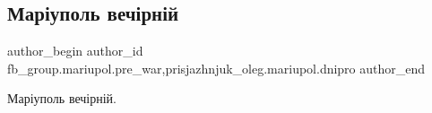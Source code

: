  
 
 
 
 

\subsection{Маріуполь вечірній}
\label{sec:09_01_2023.fb.fb_group.mariupol.pre_war.3.mar_upol_vech_rn_i}
 
\ifcmt
 author_begin
   author_id fb_group.mariupol.pre_war,prisjazhnjuk_oleg.mariupol.dnipro
 author_end
\fi

Маріуполь вечірній.
